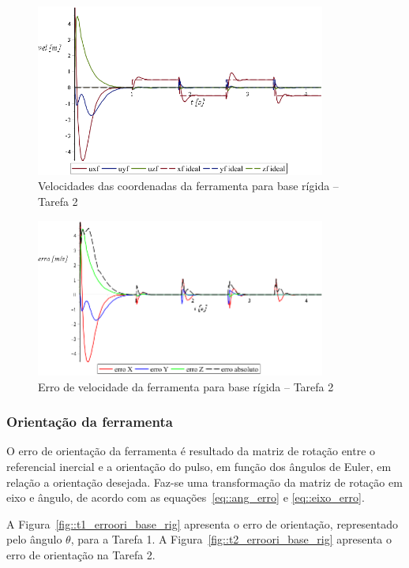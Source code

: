 \begin{figure}[h!]
	\centering 
 	\includegraphics[width=0.85\textwidth]{figs/t2_velf_base_rig}
 	\caption{Velocidades das coordenadas da ferramenta para base rígida -- Tarefa
 	2}
 	\label{fig::t2_velf_base_rig}
\end{figure}

\begin{figure}[h!]
	\centering 
 	\includegraphics[width=0.85\textwidth]{figs/t2_errovelf_base_rig}
 	\caption{Erro de velocidade da ferramenta para base rígida -- Tarefa 2}
 	\label{fig::t2_errovelf_base_rig}
\end{figure}

\subsubsection{Orientação da ferramenta}

O erro de orientação da ferramenta é resultado da matriz de rotação entre o
referencial inercial e a orientação do pulso, em função dos ângulos de Euler, em
relação a orientação desejada. Faz-se uma transformação da matriz de rotação em
eixo e ângulo, de acordo com as equações~\ref{eq::ang_erro} e
\ref{eq::eixo_erro}.

A Figura~\ref{fig::t1_erroori_base_rig} apresenta o erro de orientação,
representado pelo ângulo $\theta$, para a Tarefa 1. A
Figura~\ref{fig::t2_erroori_base_rig} apresenta o erro de orientação na Tarefa 2.

